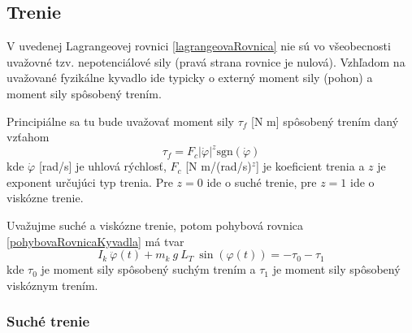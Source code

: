 \documentclass[a4paper, 10pt, ]{article}
\begin{document}
\subsection{Trenie}

V uvedenej Lagrangeovej rovnici \eqref{lagrangeovaRovnica} nie sú vo všeobecnosti uvažovné tzv. nepotenciálové sily (pravá strana rovnice je nulová). Vzhľadom na uvažované fyzikálne kyvadlo ide typicky o externý moment sily (pohon) a moment sily spôsobený trením.

Principiálne sa tu bude uvažovať moment sily $\tau_f$ [N m] spôsobený trením daný vzťahom
\begin{equation}
    \tau_f = F_{c} \left| \dot \varphi \right|^{z} \text{sgn}(\dot \varphi) 
\end{equation}
kde $\dot \varphi$ [rad/s] je uhlová rýchlosť, $F_{c}$ [N m/(rad/s)$^z$] je koeficient trenia a $z$ je exponent určujúci typ trenia. Pre $z = 0$ ide o suché trenie, pre $z = 1$ ide o viskózne trenie.

Uvažujme suché a viskózne trenie, potom pohybová rovnica \eqref{pohybovaRovnicaKyvadla} má tvar
\begin{equation} \label{pohybovaRovnicaKyvadlaTrenie}
    I_k \  \ddot\varphi(t) + m_k \  g \   L_T \  \sin(\varphi(t)) = - \tau_0 - \tau_1
\end{equation}
kde $\tau_0$ je moment sily spôsobený suchým trením a $\tau_1$ je moment sily spôsobený viskóznym trením.


\subsubsection{Suché trenie}
\end{document}
